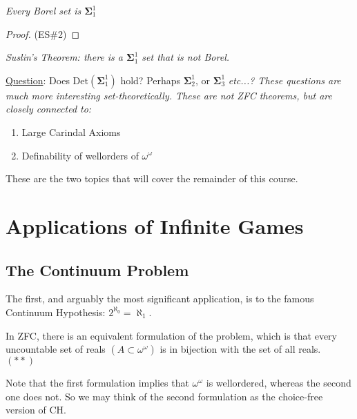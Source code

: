 \documentclass[]{article}
\newcommand{\om}{\omega}
\newcommand{\bosig}{\bm{\Sigma}}
\newcommand{\Det}{\textrm{Det}}
\begin{document}
\begin{remark*}[Proposition]
\emph{
    Every Borel set is $\bosig_1^1$
}    
\end{remark*}
\begin{proof}
    (ES\#2)
\end{proof}

\begin{remark*}[Corollary]
    \emph{
        Suslin's Theorem: there is a $\bosig_1^1$ set that is not Borel.
    }
\end{remark*}

\underline{Question}: Does $\Det(\bosig_1^1)$ hold? Perhaps $\bosig_2^1$, or $\bosig_3^1$ \it{etc...}? These questions are much more interesting set-theoretically. These are not ZFC theorems, but are closely connected to:
\begin{enumerate}
    \item Large Carindal Axioms
    \item Definability of wellorders of $\om^\om$
\end{enumerate}
These are the two topics that will cover the remainder of this course.


\section*{Applications of Infinite Games}

\subsection*{The Continuum Problem}

The first, and arguably the most significant application, is to the famous Continuum Hypothesis: $2^{\aleph_0} = \aleph_1$.

In ZFC, there is an equivalent formulation of the problem, which is that every uncountable set of reals $(A\subset \om^\om)$ is in bijection with the set of all reals. $(\ast\ast)$

Note that the first formulation implies that $\om^\om$ is wellordered, whereas the second one does not. So we may think of the second formulation as the choice-free version of CH.
\end{document}
